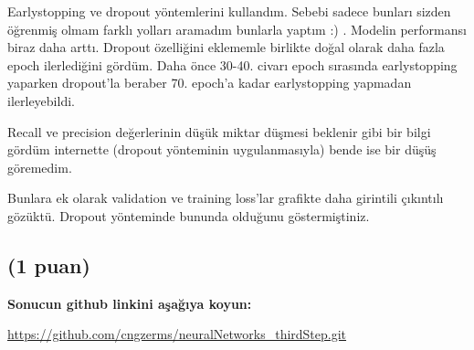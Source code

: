 \documentclass[11pt]{article}
\begin{document}
Earlystopping ve dropout yöntemlerini kullandım. Sebebi sadece bunları sizden öğrenmiş olmam farklı yolları aramadım bunlarla yaptım :) . Modelin performansı biraz daha arttı.
Dropout özelliğini eklememle birlikte doğal olarak daha fazla epoch ilerlediğini gördüm. Daha önce 30-40. civarı epoch sırasında earlystopping yaparken dropout'la beraber 70. epoch'a kadar earlystopping yapmadan ilerleyebildi.

Recall ve precision değerlerinin düşük miktar düşmesi beklenir gibi bir bilgi gördüm internette (dropout yönteminin uygulanmasıyla) bende ise bir düşüş göremedim. 

Bunlara ek olarak validation ve training loss'lar grafikte daha girintili çıkıntılı gözüktü. Dropout yönteminde bununda olduğunu göstermiştiniz.

\subsection{(1 puan)} \textbf{Sonucun github linkini  aşağıya koyun:}

\url{https://github.com/cngzerms/neuralNetworks_thirdStep.git}
\end{document}
